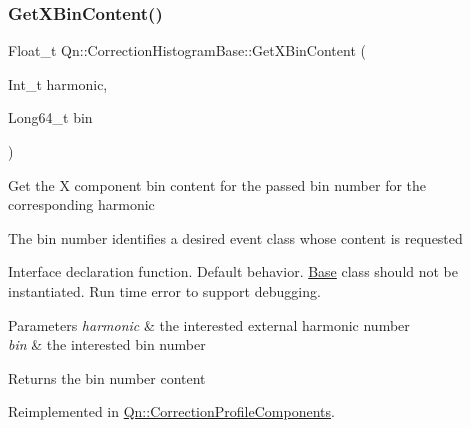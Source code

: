 \mbox{\label{classQn_1_1CorrectionHistogramBase_a3dc485a3ac0767a04691a228b3189b95}} 
\subsubsection{\texorpdfstring{Get\+X\+Bin\+Content()}{GetXBinContent()}}
{\footnotesize\ttfamily Float\+\_\+t Qn\+::\+Correction\+Histogram\+Base\+::\+Get\+X\+Bin\+Content (\begin{DoxyParamCaption}\item[{Int\+\_\+t}]{harmonic,  }\item[{Long64\+\_\+t}]{bin }\end{DoxyParamCaption})\hspace{0.3cm}{\ttfamily [virtual]}}

Get the X component bin content for the passed bin number for the corresponding harmonic

The bin number identifies a desired event class whose content is requested

Interface declaration function. Default behavior. \mbox{\hyperlink{classBase}{Base}} class should not be instantiated. Run time error to support debugging.


\begin{DoxyParams}{Parameters}
{\em harmonic} & the interested external harmonic number \\
\hline
{\em bin} & the interested bin number \\
\hline
\end{DoxyParams}
\begin{DoxyReturn}{Returns}
the bin number content 
\end{DoxyReturn}


Reimplemented in \mbox{\hyperlink{classQn_1_1CorrectionProfileComponents_a9641c29b1ceebb6c7a2e9137b27439f3}{Qn\+::\+Correction\+Profile\+Components}}.

\mbox{\label{classQn_1_1CorrectionHistogramBase_af68a693d349023b08c412fea39b54dd9}} 
